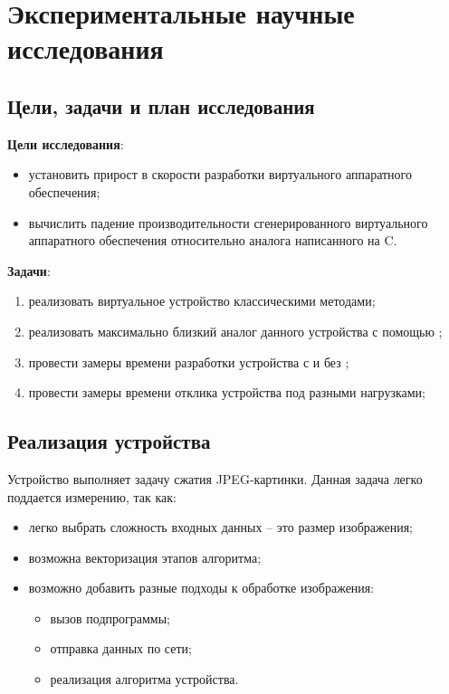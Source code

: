 \chapter{Экспериментальные научные исследования}\label{ch:ch3}

\section{Цели, задачи и план исследования}\label{sec:ch3/sec1}

\textbf{Цели исследования}:
\begin{itemize}
    \item установить прирост в скорости разработки виртуального аппаратного обеспечения;
    \item вычислить падение производительности сгенерированного виртуального аппаратного обеспечения
    относительно аналога написанного на C.
\end{itemize}


\textbf{Задачи}:
\begin{enumerate}[label={\arabic*)}]
    \item реализовать виртуальное устройство классическими методами;
    \item реализовать максимально близкий аналог данного устройства с
        помощью {\mylanguage};
    \item провести замеры времени разработки устройства
        с и без {\mylanguage};
    \item провести замеры времени отклика устройства
        под разными нагрузками;
\end{enumerate}


\section{Реализация устройства}\label{sec:ch3/sec2}

Устройство выполняет задачу сжатия JPEG-картинки.
Данная задача легко поддается измерению, так как:
\begin{itemize}
    \item легко выбрать сложность входных данных -- это
        размер изображения;
    \item возможна векторизация этапов алгоритма;
    \item возможно добавить разные подходы к обработке
        изображения:
        \begin{itemize}
            \item вызов подпрограммы;
            \item отправка данных по сети;
            \item реализация алгоритма устройства.
        \end{itemize}
\end{itemize}

